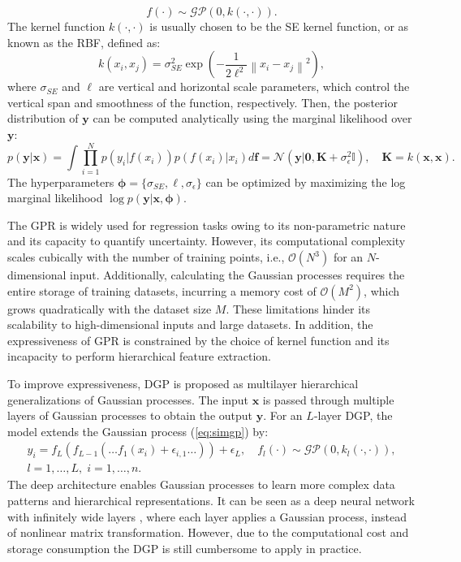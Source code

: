 \begin{equation}
    f(\cdot) \sim \mathcal{GP}(0, k(\cdot, \cdot)).
\end{equation}
The kernel function $k(\cdot, \cdot)$ is usually chosen to be the \ac{SE} kernel function, or as known as the \ac{RBF}, defined as:
\begin{equation}
    k(x_i, x_j) = \sigma_{SE}^2\exp(-\frac{1}{2\ell^2}\left\|x_i - x_j\right\|^2),
\end{equation}
where $\sigma_{SE}$ and $\ell$ are vertical and horizontal scale parameters, which control the vertical span and smoothness of the function, respectively. Then, the posterior distribution of $\boldsymbol{y}$ can be computed analytically using the marginal likelihood over $\boldsymbol{y}$:
\begin{equation}
    p(\boldsymbol{y}|\boldsymbol{x}) = \int \prod_{i=1}^{N}p(y_i|f(x_i))p(f(x_i)|x_i)d\boldsymbol{f}=\mathcal{N}(\boldsymbol{y}|\boldsymbol{0},\boldsymbol{K}+\sigma_\epsilon^2\mathbb{I}), \quad \boldsymbol{K}=k(\boldsymbol{x}, \boldsymbol{x}).
\end{equation}
The hyperparameters $\boldsymbol{\phi}=\{\sigma_{SE}, \ell, \sigma_\epsilon\}$ can be optimized by maximizing the log marginal likelihood $\log p(\boldsymbol{y}|\boldsymbol{x}, \boldsymbol{\phi})$.

The \ac{GPR} is widely used for regression tasks owing to its non-parametric nature and its capacity to quantify uncertainty. However, its computational complexity scales cubically with the number of training points, i.e., $\mathcal{O}(N^3)$ for an $N$-dimensional input. Additionally, calculating the Gaussian processes requires the entire storage of training datasets, incurring a memory cost of $\mathcal{O}(M^2)$, which grows quadratically with the dataset size $M$. These limitations hinder its scalability to high-dimensional inputs and large datasets. In addition, the expressiveness of \ac{GPR} is constrained by the choice of kernel function and its incapacity to perform hierarchical feature extraction.

To improve expressiveness, \ac{DGP} \citep{damianou2013dgp} is proposed as multilayer hierarchical generalizations of Gaussian processes. The input $\boldsymbol{x}$ is passed through multiple layers of Gaussian processes to obtain the output $\boldsymbol{y}$. For an $L$-layer \ac{DGP}, the model extends the Gaussian process (\ref{eq:simgp}) by:
\begin{multline}
    y_i = f_{L}(f_{L-1}(\dots f_{1}(x_i)+\epsilon_{i,1}\dots)) + \epsilon_{L}, \quad f_{l}(\cdot) \sim \mathcal{GP}(0, k_l(\cdot, \cdot)), \\ l=1,\dots,L,\; i=1,\dots,n.
\end{multline}  
The deep architecture enables Gaussian processes to learn more complex data patterns and hierarchical representations. It can be seen as a deep neural network with infinitely wide layers \citep{Neal1996}, where each layer applies a Gaussian process, instead of nonlinear matrix transformation. However, due to the computational cost and storage consumption the \ac{DGP} is still cumbersome to apply in practice. 

